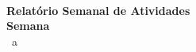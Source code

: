 \documentclass[12pt]{article}
\begin{document}
\thispagestyle{fancy}

~\vspace{20mm}

\begin{center}
\textbf{\huge Relatório Semanal de Atividades} \\[8mm]
\textbf{\Large Semana \semana} \\
{\Large \dataInicio\ a \dataFim}
\end{center}

\end{document}
